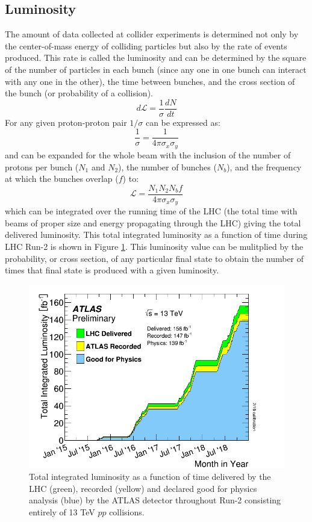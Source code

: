 \subsection{Luminosity}
The amount of data collected at collider experiments is determined not only by the center-of-mass energy of colliding particles but also by the rate of events produced.  This rate is called the luminosity and can be determined by the square of the number of particles in each bunch (since any one in one bunch can interact with any one in the other), the time between bunches, and the cross section of the bunch (or probability of a collision).
\[ d\mathcal{L}=\frac{1}{\sigma}\frac{dN}{dt} \]
For any given proton-proton pair $1/\sigma$ can be expressed as:
\[ \frac{1}{\sigma}=\frac{1}{4\pi \sigma_x \sigma_y} \]
and can be expanded for the whole beam with the inclusion of the number of protons per bunch ($N_1$ and $N_2$), the number of bunches ($N_b$), and the frequency at which the bunches overlap ($f$) to:
\[ \mathcal{L}=\frac{N_1 N_2 N_b f}{4 \pi \sigma_x \sigma_y} \]
which can be integrated over the running time of the LHC (the total time with beams of proper size and energy propagating through the LHC) giving the total delivered luminosity.  This total integrated luminosity as a function of time during LHC Run-2 is shown in Figure \ref{fig:ATLASLumi}.  This luminosity value can be mulitplied by the probability, or cross section, of any particular final state to obtain the number of times that final state is produced with a given luminosity.
\begin{figure}[ht!]
	\centering
	\includegraphics[width=.7\columnwidth]{../ThesisImages/LHCImages/ATLASLumi.png}
	\caption[Total integrated luminosity as a function of time delivered by the LHC (green), recorded (yellow) and declared good for physics analysis (blue) by the ATLAS detector throughout Run-2 consisting entirely of 13 TeV $pp$ collisions.]{Total integrated luminosity as a function of time delivered by the LHC (green), recorded (yellow) and declared good for physics analysis (blue) by the ATLAS detector throughout Run-2 consisting entirely of 13 TeV $pp$ collisions\cite{ATLASLumi}.}
	\label{fig:ATLASLumi}
\end{figure}


